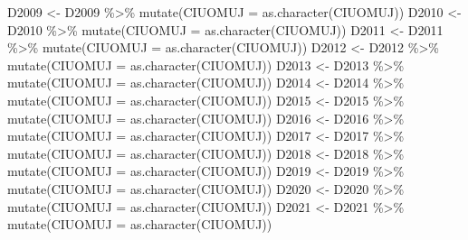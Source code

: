 \documentclass[
]{article}
\newenvironment{Shaded}{\begin{snugshade}}{\end{snugshade}}
\newcommand{\AttributeTok}[1]{\textcolor[rgb]{0.77,0.63,0.00}{#1}}
\newcommand{\FunctionTok}[1]{\textcolor[rgb]{0.00,0.00,0.00}{#1}}
\newcommand{\NormalTok}[1]{#1}
\newcommand{\OtherTok}[1]{\textcolor[rgb]{0.56,0.35,0.01}{#1}}
\newcommand{\SpecialCharTok}[1]{\textcolor[rgb]{0.00,0.00,0.00}{#1}}
\begin{document}
\begin{Shaded}
\begin{Highlighting}[]
\NormalTok{D2009 }\OtherTok{\textless{}{-}}\NormalTok{ D2009 }\SpecialCharTok{\%\textgreater{}\%} \FunctionTok{mutate}\NormalTok{(}\AttributeTok{CIUOMUJ =} \FunctionTok{as.character}\NormalTok{(CIUOMUJ))}
\NormalTok{D2010 }\OtherTok{\textless{}{-}}\NormalTok{ D2010 }\SpecialCharTok{\%\textgreater{}\%} \FunctionTok{mutate}\NormalTok{(}\AttributeTok{CIUOMUJ =} \FunctionTok{as.character}\NormalTok{(CIUOMUJ))}
\NormalTok{D2011 }\OtherTok{\textless{}{-}}\NormalTok{ D2011 }\SpecialCharTok{\%\textgreater{}\%} \FunctionTok{mutate}\NormalTok{(}\AttributeTok{CIUOMUJ =} \FunctionTok{as.character}\NormalTok{(CIUOMUJ))}
\NormalTok{D2012 }\OtherTok{\textless{}{-}}\NormalTok{ D2012 }\SpecialCharTok{\%\textgreater{}\%} \FunctionTok{mutate}\NormalTok{(}\AttributeTok{CIUOMUJ =} \FunctionTok{as.character}\NormalTok{(CIUOMUJ))}
\NormalTok{D2013 }\OtherTok{\textless{}{-}}\NormalTok{ D2013 }\SpecialCharTok{\%\textgreater{}\%} \FunctionTok{mutate}\NormalTok{(}\AttributeTok{CIUOMUJ =} \FunctionTok{as.character}\NormalTok{(CIUOMUJ))}
\NormalTok{D2014 }\OtherTok{\textless{}{-}}\NormalTok{ D2014 }\SpecialCharTok{\%\textgreater{}\%} \FunctionTok{mutate}\NormalTok{(}\AttributeTok{CIUOMUJ =} \FunctionTok{as.character}\NormalTok{(CIUOMUJ))}
\NormalTok{D2015 }\OtherTok{\textless{}{-}}\NormalTok{ D2015 }\SpecialCharTok{\%\textgreater{}\%} \FunctionTok{mutate}\NormalTok{(}\AttributeTok{CIUOMUJ =} \FunctionTok{as.character}\NormalTok{(CIUOMUJ))}
\NormalTok{D2016 }\OtherTok{\textless{}{-}}\NormalTok{ D2016 }\SpecialCharTok{\%\textgreater{}\%} \FunctionTok{mutate}\NormalTok{(}\AttributeTok{CIUOMUJ =} \FunctionTok{as.character}\NormalTok{(CIUOMUJ))}
\NormalTok{D2017 }\OtherTok{\textless{}{-}}\NormalTok{ D2017 }\SpecialCharTok{\%\textgreater{}\%} \FunctionTok{mutate}\NormalTok{(}\AttributeTok{CIUOMUJ =} \FunctionTok{as.character}\NormalTok{(CIUOMUJ))}
\NormalTok{D2018 }\OtherTok{\textless{}{-}}\NormalTok{ D2018 }\SpecialCharTok{\%\textgreater{}\%} \FunctionTok{mutate}\NormalTok{(}\AttributeTok{CIUOMUJ =} \FunctionTok{as.character}\NormalTok{(CIUOMUJ))}
\NormalTok{D2019 }\OtherTok{\textless{}{-}}\NormalTok{ D2019 }\SpecialCharTok{\%\textgreater{}\%} \FunctionTok{mutate}\NormalTok{(}\AttributeTok{CIUOMUJ =} \FunctionTok{as.character}\NormalTok{(CIUOMUJ))}
\NormalTok{D2020 }\OtherTok{\textless{}{-}}\NormalTok{ D2020 }\SpecialCharTok{\%\textgreater{}\%} \FunctionTok{mutate}\NormalTok{(}\AttributeTok{CIUOMUJ =} \FunctionTok{as.character}\NormalTok{(CIUOMUJ))}
\NormalTok{D2021 }\OtherTok{\textless{}{-}}\NormalTok{ D2021 }\SpecialCharTok{\%\textgreater{}\%} \FunctionTok{mutate}\NormalTok{(}\AttributeTok{CIUOMUJ =} \FunctionTok{as.character}\NormalTok{(CIUOMUJ))}
\end{Highlighting}
\end{Shaded}
\end{document}
